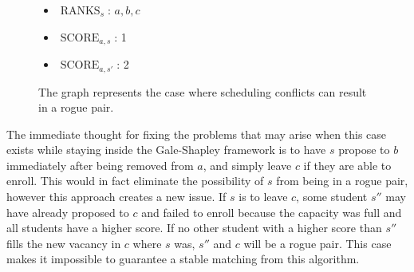 \documentclass{article}
\newcommand{\ranks}{\operatorname{RANKS}}
\newcommand{\score}{\operatorname{SCORE}}
\begin{document}
\begin{figure}
  \centering

  \begin{itemize}
  \item \(\ranks_{s}\): $a, b, c$
  \item \(\score_{a, s}\): 1
  \item \(\score_{a, s'}\): 2
  \end{itemize}
  
  \caption{The graph represents the case where scheduling conflicts can result in a rogue pair.}
  \label{fig:graph}
\end{figure}

The immediate thought for fixing the problems that may arise when this case exists while staying inside the Gale-Shapley framework is to have $s$ propose to $b$ immediately after being removed from $a$, and simply leave $c$ if they are able to enroll. This would in fact eliminate the possibility of $s$ from being in a rogue pair, however this approach creates a new issue. If $s$ is to leave $c$, some student $s''$ may have already proposed to $c$ and failed to enroll because the capacity was full and all students have a higher score. If no other student with a higher score than $s''$ fills the new vacancy in $c$ where $s$ was, $s''$ and $c$ will be a rogue pair. This case makes it impossible to guarantee a stable matching from this algorithm.
\end{document}
